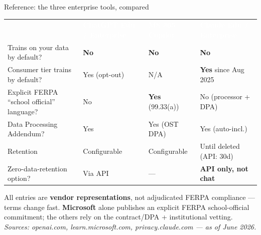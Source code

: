 \documentclass[aspectratio=169, 10pt]{beamer}
\newcommand{\cmcite}[1]{{\scriptsize\color{CoolGray}\textit{#1}}}
\begin{document}

\begin{frame}{Reference: the three enterprise tools, compared}
\vskip-2pt
{\footnotesize
\begin{tabular}{>{\raggedright\arraybackslash}m{3.9cm} >{\centering\arraybackslash}m{2.7cm} >{\centering\arraybackslash}m{2.7cm} >{\centering\arraybackslash}m{2.7cm}}
\rowcolor{SlateTeal}
\textcolor{white}{\textbf{}} & \textcolor{white}{\textbf{ChatGPT Edu / Enterprise}} & \textcolor{white}{\textbf{MS 365 Copilot}} & \textcolor{white}{\textbf{Claude Edu / Enterprise}} \\[1pt]
\rowcolor{PaleSage}
Trains on your data by default? & \textcolor{GoGreen}{\textbf{No}} & \textcolor{GoGreen}{\textbf{No}} & \textcolor{GoGreen}{\textbf{No}} \\[1pt]
\rowcolor{white}
Consumer tier trains by default? & Yes (opt-out) & N/A & \textbf{Yes} since Aug 2025 \\[1pt]
\rowcolor{PaleSage}
Explicit FERPA ``school official'' language? & \textcolor{SoftCoral}{No} & \textcolor{GoGreen}{\textbf{Yes}} (99.33(a)) & \textcolor{SoftCoral}{No} (processor + DPA) \\[1pt]
\rowcolor{white}
Data Processing Addendum? & Yes & Yes (OST DPA) & Yes (auto-incl.) \\[1pt]
\rowcolor{PaleSage}
Retention & Configurable & Configurable & Until deleted (API: 30d) \\[1pt]
\rowcolor{white}
Zero-data-retention option? & Via API & --- & \textbf{API only, not chat} \\[1pt]
\end{tabular}
}
\vskip4pt
\begin{tcolorbox}[quotebox, width=13cm, top=2pt, bottom=2pt]
\scriptsize All entries are \textbf{vendor representations}, not adjudicated FERPA compliance --- terms change fast. \textbf{Microsoft} alone publishes an explicit FERPA school-official commitment; the others rely on the contract/DPA + institutional vetting. \cmcite{Sources: openai.com, learn.microsoft.com, privacy.claude.com --- as of June 2026.}
\end{tcolorbox}
\end{frame}

\end{document}
